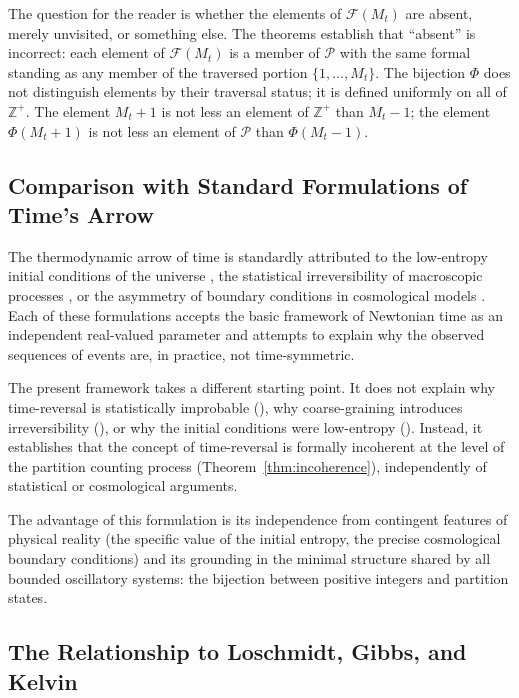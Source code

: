 \documentclass[twocolumn,10pt,a4paper]{article}
\theoremstyle{thmstyle}
\theoremstyle{definition}
\theoremstyle{remark}
\newcommand{\Zp}{\mathbb{Z}^{+}}
\newcommand{\Parts}{\mathcal{P}}
\newcommand{\PhiMap}{\varPhi}
\begin{document}
The question for the reader is whether the elements of $\mathcal{F}(M_t)$ are absent, merely unvisited, or something else. The theorems establish that ``absent'' is incorrect: each element of $\mathcal{F}(M_t)$ is a member of $\Parts$ with the same formal standing as any member of the traversed portion $\{1, \ldots, M_t\}$. The bijection $\PhiMap$ does not distinguish elements by their traversal status; it is defined uniformly on all of $\Zp$. The element $M_t + 1$ is not less an element of $\Zp$ than $M_t - 1$; the element $\PhiMap(M_t + 1)$ is not less an element of $\Parts$ than $\PhiMap(M_t - 1)$.

\subsection{Comparison with Standard Formulations of Time's Arrow}

The thermodynamic arrow of time is standardly attributed to the low-entropy initial conditions of the universe \citep{penrose1979,penrose2004}, the statistical irreversibility of macroscopic processes \citep{boltzmann1877,boltzmann1896}, or the asymmetry of boundary conditions in cosmological models \citep{hawking1985,reichenbach1956}. Each of these formulations accepts the basic framework of Newtonian time as an independent real-valued parameter and attempts to explain why the observed sequences of events are, in practice, not time-symmetric.

The present framework takes a different starting point. It does not explain why time-reversal is statistically improbable (\citealt{boltzmann1877}), why coarse-graining introduces irreversibility (\citealt{gibbs1902}), or why the initial conditions were low-entropy (\citealt{penrose2004}). Instead, it establishes that the concept of time-reversal is formally incoherent at the level of the partition counting process (Theorem~\ref{thm:incoherence}), independently of statistical or cosmological arguments.

The advantage of this formulation is its independence from contingent features of physical reality (the specific value of the initial entropy, the precise cosmological boundary conditions) and its grounding in the minimal structure shared by all bounded oscillatory systems: the bijection between positive integers and partition states.

\subsection{The Relationship to Loschmidt, Gibbs, and Kelvin}
\end{document}
